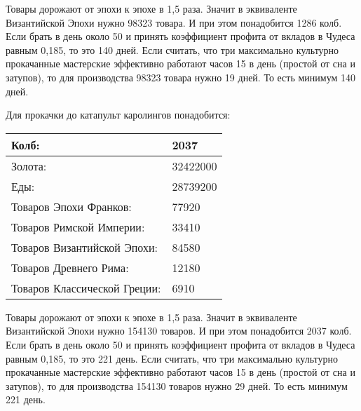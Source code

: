 Товары дорожают от эпохи к эпохе в 1,5 раза.
Значит в эквиваленте Византийской Эпохи нужно 98323 товара.
И при этом понадобится 1286 колб. Если брать в день около 50 и принять коэффициент профита от вкладов
в Чудеса равным 0,185, то это 140 дней.
Если считать, что три максимально культурно прокачанные мастерские эффективно работают часов 15 в день (простой от сна и затупов),
то для производства 98323 товара нужно 19 дней.
То есть минимум 140 дней.


Для прокачки до катапульт каролингов понадобится:

\begin{center}
    \begin{tabular}[h!]{|l|l|}
        \hline
        Колб:   & 2037 \\\hline
        Золота: & 32422000 \\\hline
        Еды:    & 28739200 \\\hline
        Товаров Эпохи Франков: & 77920 \\\hline
        Товаров Римской Империи: & 33410 \\\hline
        Товаров Византийской Эпохи: & 84580 \\\hline
        Товаров Древнего Рима: & 12180 \\\hline
        Товаров Классической Греции: & 6910 \\\hline
    \end{tabular}
\end{center}

Товары дорожают от эпохи к эпохе в 1,5 раза.
Значит в эквиваленте Византийской Эпохи нужно 154130 товаров.
И при этом понадобится 2037 колб. Если брать в день около 50 и принять коэффициент профита от вкладов
в Чудеса равным 0,185, то это 221 день.
Если считать, что три максимально культурно прокачанные мастерские эффективно работают часов 15 в день (простой от сна и затупов),
то для производства 154130 товаров нужно 29 дней.
То есть минимум 221 день.
